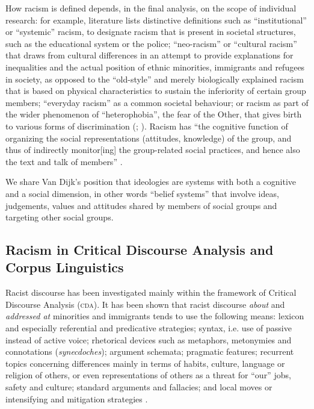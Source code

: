 \documentclass[output=paper]{LSP/langsci}
\begin{document}
How racism is defined depends, in the final analysis, on the scope of individual research: for example, literature lists distinctive definitions such as “institutional” or “systemic” racism, to designate racism that is present in societal structures, such as the educational system or the police; “neo-racism” or “cultural racism” that draws from cultural differences in an attempt to provide explanations for inequalities and the actual position of ethnic minorities, immigrants and refugees in society, as opposed to the “old-style” and merely biologically explained racism that is based on physical characteristics to sustain the inferiority of certain group members; “everyday racism” as a common societal behaviour; or racism as part of the wider phenomenon of “heterophobia”, the fear of the Other, that gives birth to various forms of discrimination (\citealt{Essed1991,Reisigl2001}; \citealt[118]{Memmi2000}). Racism has “the cognitive function of organizing the social representations (attitudes, knowledge) of the group, and thus of indirectly monitor[ing] the group-related social practices, and hence also the text and talk of members” \citep[248]{Dijk1995}.

We share Van Dijk's position that ideologies are systems with both a cognitive and a social dimension, in other words “belief systems” that involve ideas, judgements, values and attitudes shared by members of social groups and targeting other social groups.

\subsection{Racism in Critical Discourse Analysis and Corpus Linguistics} \label{sec:2:2:2}
Racist discourse has been investigated mainly within the framework of Critical Discourse Analysis (\textsc{cda}). It has been shown that racist discourse \textit{about} and \textit{addressed at} minorities and immigrants tends to use the following means: lexicon and especially referential and predicative strategies; syntax, i.e. use of passive instead of active voice; rhetorical devices such as metaphors, metonymies and connotations (\textit{synecdoches}); argument schemata; pragmatic features; recurrent topics concerning differences mainly in terms of habits, culture, language or religion of others, or even representations of others as a threat for “our” jobs, safety and culture; standard arguments and fallacies; and local moves or intensifying and mitigation strategies \citep{Reisigl2001,Dijk2000a,Dijk2000b, Dijk2002}.
\end{document}
